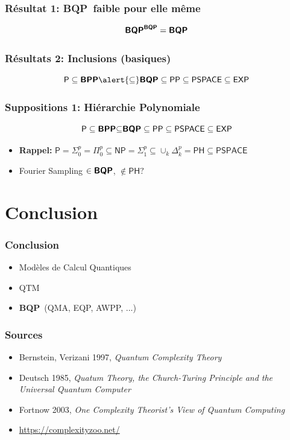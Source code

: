 \documentclass{beamer}
\newcommand{\bqp}{\textsf{\textbf{BQP}}}
\newcommand{\bpp}{\textsf{\textbf{BPP}}}
\begin{document}
\begin{frame}
  \frametitle{R\'esultat 1: \bqp \ faible pour elle m\^eme}

  \[\bqp^{\bqp} = \bqp\]
\end{frame}

\begin{frame}
  \frametitle{R\'esultats 2: Inclusions (basiques)}

  \[\textsf{P} \subseteq \bpp \alert{\subseteq} \bqp \subseteq \textsf{PP} \subseteq \textsf{PSPACE} \subseteq \textsf{EXP} \]
\end{frame}

\begin{frame}
  \frametitle{Suppositions 1: Hi\'erarchie Polynomiale}

  \[\textsf{P} \subseteq \bpp {\subseteq} \bqp \subseteq \textsf{PP} \subseteq \textsf{PSPACE} \subseteq \textsf{EXP} \]
  \begin{itemize}
    \item \textbf{Rappel:} $\textsf{P} = \Sigma_0^p = \Pi_0^p \subseteq \textsf{NP} = \Sigma_1^p \subseteq \cup_k \Delta_k^p = \textsf{PH} \subseteq \textsf{PSPACE}$ \pause
    \item Fourier Sampling $\in \bqp$, $\notin \textsf{PH}?$
  \end{itemize}
\end{frame}

\section{Conclusion}

\begin{frame}
  \frametitle{Conclusion}

  \begin{itemize}
    \item Mod\`eles de Calcul Quantiques
    \item QTM
    \item \bqp \ (\textsf{QMA}, \textsf{EQP}, \textsf{AWPP}, ...)
  \end{itemize}
\end{frame}

\begin{frame}
  \frametitle{Sources}

  \begin{itemize}
    \item Bernstein, Verizani 1997, \emph{Quantum Complexity Theory}
    \item Deutsch 1985, \emph{Quatum Theory, the Church-Turing Principle and the Universal Quantum Computer}
    \item Fortnow 2003, \emph{One Complexity Theorist's View of Quantum Computing}
    \item \url{https://complexityzoo.net/}
  \end{itemize}
\end{frame}
\end{document}
